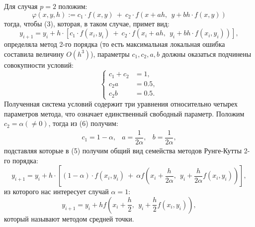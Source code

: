Для случая $p=2$ положим:
\begin{equation}
    \varphi(x,y,h) := c_1\cdot f(x,y) ~+~ c_2\cdot f(x+ah,~~ y+bh\cdot f(x,y))
\end{equation}
тогда, чтобы (3), которая, в таком случае, примет вид:
\begin{equation}
    y_{i+1} = y_i + h \cdot \left[ c_1\cdot f(x_i,y_i) ~+~ c_2\cdot f(x_i+ah,~~ y_i+bh\cdot f(x_i,y_i)) \right],
\end{equation}
определяла метод 2-го порядка (то есть максимальная локальная ошибка составила величину $O(h^3)$), параметры $c_1, c_2, a, b$ должны оказаться подчинены совокупности условий:
\begin{equation}
\begin{cases}
    c_1 + c_2 &= 1,\\
    c_2a &= 0.5,\\
    c_2b &= 0.5.
\end{cases}
\end{equation}
Полученная система условий содержит три уравнения относительно четырех параметров метода, что означает единственный свободный параметр. Положим $c_2 = \alpha (\ne 0)$, тогда из (6) получим:
\begin{equation}
    \begin{matrix}
        c_1=1-\alpha, & a=\dfrac{1}{2\alpha}, & b=\dfrac{1}{2\alpha},
    \end{matrix}
\end{equation}
подставляя которые в (5) получим общий вид семейства методов Рунге-Кутты 2-го порядка:
\begin{equation}
     y_{i+1} = y_i + h \cdot \left[ (1-\alpha)\cdot f(x_i,y_i) ~+~ \alpha f\left(x_i+\dfrac{h}{2\alpha},~~ y_i+\dfrac{h}{2\alpha}f(x_i,y_i)\right) \right],
\end{equation}
из которого нас интересует случай $\alpha=1$:
\begin{equation}
    y_{i+1} = y_i + hf\left(x_i+\dfrac{h}{2},~~ y_i+\dfrac{h}{2}f(x_i,y_i)\right),
\end{equation}
который называют методом средней точки.


